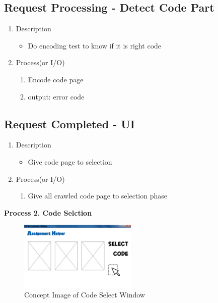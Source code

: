 \documentclass[conference]{IEEEtran}
\begin{document}
\subsection{Request Processing - Detect Code Part}
\begin{enumerate}
\item Description
  \begin{itemize}
    \item Do encoding test to know if it is right code
  \end{itemize}
  \item Process(or I/O)
  \begin{enumerate}
    \item Encode code page
    \item output: error code
  \end{enumerate}
\end{enumerate}
\textit{}


\subsection{Request Completed - UI}
\begin{enumerate}
  \item Description
  \begin{itemize}
    \item Give code page to selection
  \end{itemize}
  \item Process(or I/O)
  \begin{enumerate}
    \item Give all crawled code page to selection phase
  \end{enumerate}
\end{enumerate}

\textit{}

\textbf{Process 2. Code Selction}


\textit{}
\begin{figure}[ht]
\centering
\includegraphics[width=0.5\textwidth]{./figures/UI_code_select.jpg}
\caption{Concept Image of Code Select Window}
\label{fig_concept_code_select}
\end{figure}
\end{document}
